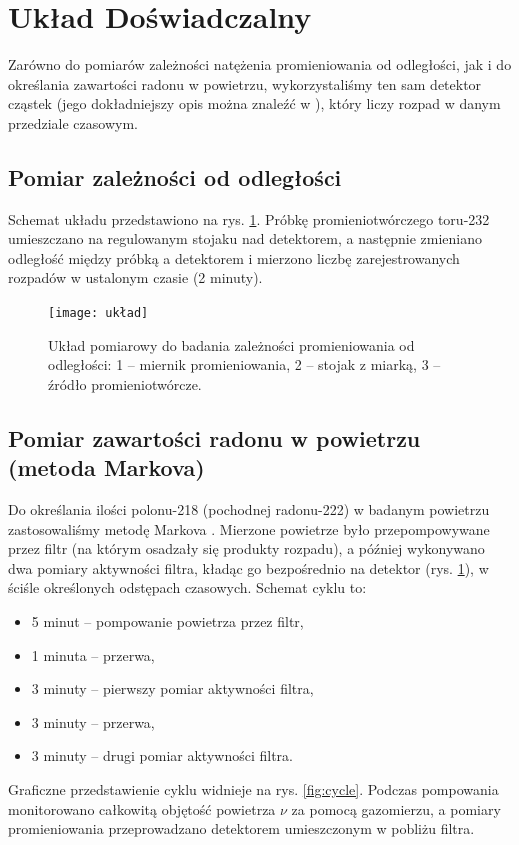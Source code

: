 \documentclass[12pt]{article}
\begin{document}
\section{Układ Doświadczalny}
Zarówno do pomiarów zależności natężenia promieniowania od odległości, jak i do określania zawartości radonu w powietrzu, wykorzystaliśmy ten sam detektor cząstek (jego dokładniejszy opis można znaleźć w \cite{skrypt}), który liczy rozpad w danym przedziale czasowym.

\subsection{Pomiar zależności od odległości}
Schemat układu przedstawiono na rys. \ref{fig:diagram}. Próbkę promieniotwórczego toru-232 umieszczano na regulowanym stojaku nad detektorem, a następnie zmieniano odległość między próbką a detektorem i mierzono liczbę zarejestrowanych rozpadów w ustalonym czasie (2 minuty).

\begin{figure}[H]
	\centering
	\texttt{[image: układ]}
	\caption{Układ pomiarowy do badania zależności promieniowania od odległości: 1 – miernik promieniowania, 2 – stojak z miarką, 3 – źródło promieniotwórcze.}
	\label{fig:diagram}
\end{figure}

\subsection{Pomiar zawartości radonu w powietrzu (metoda Markova)}
Do określania ilości polonu-218 (pochodnej radonu-222) w badanym powietrzu zastosowaliśmy metodę Markova \cite{equation}. Mierzone powietrze było przepompowywane przez filtr (na którym osadzały się produkty rozpadu), a później wykonywano dwa pomiary aktywności filtra, kładąc go bezpośrednio na detektor (rys. \ref{fig:diagram}), w ściśle określonych odstępach czasowych. Schemat cyklu to:
\begin{itemize}
	\item 5 minut – pompowanie powietrza przez filtr,
	\item 1 minuta – przerwa,
	\item 3 minuty – pierwszy pomiar aktywności filtra,
	\item 3 minuty – przerwa,
	\item 3 minuty – drugi pomiar aktywności filtra.
\end{itemize}
Graficzne przedstawienie cyklu widnieje na rys. \ref{fig:cycle}. Podczas pompowania monitorowano całkowitą objętość powietrza \(\nu\) za pomocą gazomierzu, a pomiary promieniowania przeprowadzano detektorem umieszczonym w pobliżu filtra.
\end{document}
